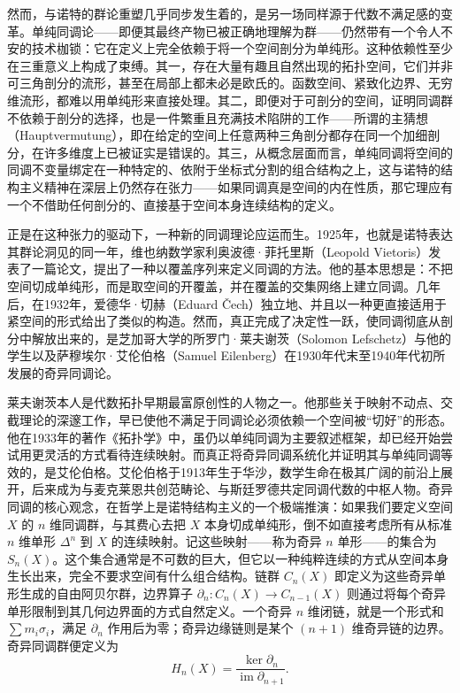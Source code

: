 \documentclass[12pt,a4paper]{article}
\begin{document}
然而，与诺特的群论重塑几乎同步发生着的，是另一场同样源于代数不满足感的变革。单纯同调论——即便其最终产物已被正确地理解为群——仍然带有一个令人不安的技术枷锁：它在定义上完全依赖于将一个空间剖分为单纯形。这种依赖性至少在三重意义上构成了束缚。其一，存在大量有趣且自然出现的拓扑空间，它们并非可三角剖分的流形，甚至在局部上都未必是欧氏的。函数空间、紧致化边界、无穷维流形，都难以用单纯形来直接处理。其二，即便对于可剖分的空间，证明同调群不依赖于剖分的选择，也是一件繁重且充满技术陷阱的工作——所谓的主猜想（Hauptvermutung），即在给定的空间上任意两种三角剖分都存在同一个加细剖分，在许多维度上已被证实是错误的。其三，从概念层面而言，单纯同调将空间的同调不变量绑定在一种特定的、依附于坐标式分割的组合结构之上，这与诺特的结构主义精神在深层上仍然存在张力——如果同调真是空间的内在性质，那它理应有一个不借助任何剖分的、直接基于空间本身连续结构的定义。

正是在这种张力的驱动下，一种新的同调理论应运而生。1925年，也就是诺特表达其群论洞见的同一年，维也纳数学家利奥波德·菲托里斯（Leopold Vietoris）发表了一篇论文，提出了一种以覆盖序列来定义同调的方法。他的基本思想是：不把空间切成单纯形，而是取空间的开覆盖，并在覆盖的交集网络上建立同调。几年后，在1932年，爱德华·切赫（Eduard Čech）独立地、并且以一种更直接适用于紧空间的形式给出了类似的构造。然而，真正完成了决定性一跃，使同调彻底从剖分中解放出来的，是芝加哥大学的所罗门·莱夫谢茨（Solomon Lefschetz）与他的学生以及萨穆埃尔·艾伦伯格（Samuel Eilenberg）在1930年代末至1940年代初所发展的奇异同调论。

莱夫谢茨本人是代数拓扑早期最富原创性的人物之一。他那些关于映射不动点、交截理论的深邃工作，早已使他不满足于同调论必须依赖一个空间被“切好”的形态。他在1933年的著作《拓扑学》中，虽仍以单纯同调为主要叙述框架，却已经开始尝试用更灵活的方式看待连续映射。而真正将奇异同调系统化并证明其与单纯同调等效的，是艾伦伯格。艾伦伯格于1913年生于华沙，数学生命在极其广阔的前沿上展开，后来成为与麦克莱恩共创范畴论、与斯廷罗德共定同调代数的中枢人物。奇异同调的核心观念，在哲学上是诺特结构主义的一个极端推演：如果我们要定义空间 $X$ 的 $n$ 维同调群，与其费心去把 $X$ 本身切成单纯形，倒不如直接考虑所有从标准 $n$ 维单形 $\Delta^n$ 到 $X$ 的连续映射。记这些映射——称为奇异 $n$ 单形——的集合为 $S_n(X)$。这个集合通常是不可数的巨大，但它以一种纯粹连续的方式从空间本身生长出来，完全不要求空间有什么组合结构。链群 $C_n(X)$ 即定义为这些奇异单形生成的自由阿贝尔群，边界算子 $\partial_n: C_n(X) \to C_{n-1}(X)$ 则通过将每个奇异单形限制到其几何边界面的方式自然定义。一个奇异 $n$ 维闭链，就是一个形式和 $\sum m_i \sigma_i$，满足 $\partial_n$ 作用后为零；奇异边缘链则是某个 $(n+1)$ 维奇异链的边界。奇异同调群便定义为
$$
H_n(X) = \frac{\ker \partial_n}{\operatorname{im} \partial_{n+1}}.
$$
\end{document}
